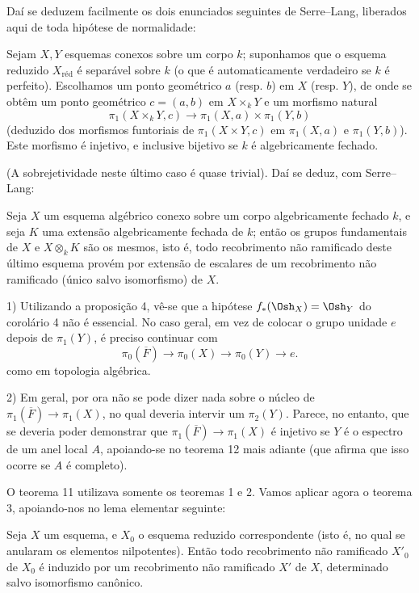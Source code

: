 Daí se deduzem facilmente os dois enunciados seguintes de Serre--Lang,
liberados aqui de toda hipótese de normalidade:

 Sejam $X,Y$ esquemas conexos sobre um corpo $k$;
suponhamos que o esquema reduzido $X_{\mathrm{réd}}$ é separável sobre $k$
(o que é automaticamente verdadeiro se $k$ é perfeito).
Escolhamos um ponto geométrico $a$ (resp. $b$) em $X$ (resp. $Y$), de onde se
obtêm um ponto geométrico $c=(a,b)$ em $X\times_kY$ e um morfismo natural
\[
  \pi_1(X\times_kY,c)\longrightarrow
  \pi_1(X,a)\times\pi_1(Y,b)
\]
(deduzido dos morfismos funtoriais de $\pi_1(X\times Y,c)$ em $\pi_1(X,a)$
e $\pi_1(Y,b)$). Este morfismo é injetivo, e inclusive bijetivo se $k$ é
algebricamente fechado.

(A sobrejetividade neste último caso é quase trivial). Daí se deduz,
com Serre--Lang:

 Seja $X$ um esquema algébrico conexo sobre um corpo
algebricamente fechado $k$, e seja $K$ uma extensão algebricamente fechada
de $k$; então os grupos fundamentais de $X$ e $X\otimes_kK$ são os
mesmos, isto é, todo recobrimento não ramificado deste último esquema
provém por extensão de escalares de um recobrimento não ramificado (único
salvo isomorfismo) de $X$.


1) Utilizando a proposição 4, vê-se que a hipótese
$f_*(\Osh_X)=\Osh_Y$ do corolário 4 não é essencial. No caso geral, em vez
de colocar o grupo unidade $e$ depois de $\pi_1(Y)$, é preciso continuar com
\[
  \pi_0(\overline F)\longrightarrow\pi_0(X)
  \longrightarrow\pi_0(Y)\longrightarrow e.
\]
como em topologia algébrica.

2) Em geral, por ora não se pode dizer nada sobre o núcleo de
$\pi_1(\overline F)\longrightarrow\pi_1(X)$, no qual deveria intervir um
$\pi_2(Y)$. Parece, no entanto, que se deveria poder demonstrar que
$\pi_1(\overline F)\longrightarrow\pi_1(X)$ é injetivo se $Y$ é o espectro
de um anel local $A$, apoiando-se no teorema 12 mais adiante (que afirma que
isso ocorre se $A$ é completo).

O teorema 11 utilizava somente os teoremas 1 e 2. Vamos aplicar agora o
teorema 3, apoiando-nos no lema elementar seguinte:

 Seja $X$ um esquema, e $X_0$ o esquema reduzido correspondente
(isto é, no qual se anularam os elementos nilpotentes). Então todo
recobrimento não ramificado $X'_0$ de $X_0$ é induzido por um recobrimento
não ramificado $X'$ de $X$, determinado salvo isomorfismo canônico.

